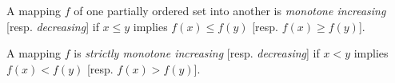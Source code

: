 A mapping $f$ of one partially ordered set into another is \textit{monotone increasing} [resp. \textit{decreasing}] if $x \leq y$ implies $f(x) \leq f(y)$ [resp. $f(x) \geq f(y)$].

A mapping $f$ is \textit{strictly monotone increasing} [resp. \textit{decreasing}] if $x < y$ implies $f(x) < f(y)$ [resp. $f(x) > f(y)$].
